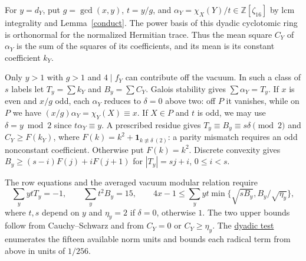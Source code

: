 \documentclass[11pt]{amsart}
\numberwithin{equation}{section}
\newcommand{\supfile}[2]{\href{https://github.com/sebastienpalcoux/WGT-fusion-categories/blob/433d1c45795202991f1693e00d9770e4cccf05f6/papers/rank-bound-supplement/#1}{#2}}
\begin{document}
For $y=d_Y$, put $g=\gcd(x,y)$, $t=y/g$, and
$\alpha_Y=\chi_X(Y)/t\in\mathbb Z[\zeta_{16}]$ by lcm integrality
and Lemma~\ref{conduct}. The power basis of this dyadic cyclotomic ring
is orthonormal for the normalized Hermitian trace. Thus the mean square
$C_Y$ of $\alpha_Y$ is the sum of the squares of its coefficients, and
its mean is its constant coefficient $k_Y$.

Only $y>1$ with $g>1$ and $4\mid f_Y$ can contribute off the vacuum.
In such a class of $s$ labels let $T_y=\sum k_Y$ and $B_y=\sum C_Y$.
Galois stability gives $\sum\alpha_Y=T_y$. If $x$ is even and $x/g$
odd, each $\alpha_Y$ reduces to $\delta=0$ above two: off $P$ it
vanishes, while on $P$ we have $(x/g)\alpha_Y=\chi_Y(X)\equiv x$.
If $X\in P$ and $t$ is odd, we may use $\delta=y\bmod2$ since
$t\alpha_Y\equiv y$. A prescribed residue gives
$T_y\equiv B_y\equiv s\delta\pmod2$ and $C_Y\ge F(k_Y)$, where
$F(k)=k^2+\mathbf1_{k\not\equiv\delta\ (2)}$: a parity mismatch
requires an odd nonconstant coefficient. Otherwise put $F(k)=k^2$.
Discrete convexity gives $B_y\ge(s-i)F(j)+iF(j+1)$ for
$|T_y|=sj+i$, $0\le i<s$.

The row equations and the averaged vacuum modular relation require
\[
 \sum_y ytT_y=-1,\qquad \sum_y t^2B_y=15,\qquad
 4x-1\le\sum_y yt\min\{\sqrt{sB_y}, B_y/\sqrt{\eta_y}\},
\]
where $t,s$ depend on $y$ and $\eta_y=2$ if $\delta=0$, otherwise $1$.
The two upper bounds follow from Cauchy--Schwarz and from
$C_Y=0$ or $C_Y\ge\eta_y$. The \supfile{screen.py}{dyadic test}
enumerates the fifteen available norm units and bounds each radical
term from above in units of $1/256$.

\clearpage
\end{document}

